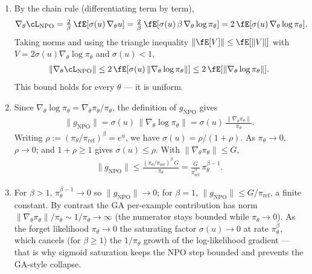\documentclass[12pt]{article}
\begin{document}
\begin{enumerate}
\begin{solution}
\begin{enumerate}
    \item By the chain rule (differentiating term by term),
    \begin{align*}
        \nabla_\theta\cL_{\mathrm{NPO}} = \tfrac{2}{\beta}\,\fE[\sigma(u)\,\nabla_\theta u] = \tfrac{2}{\beta}\,\fE[\sigma(u)\,\beta\,\nabla_\theta\log\pi_\theta] = 2\,\fE[\sigma(u)\,\nabla_\theta\log\pi_\theta].
    \end{align*}
    Taking norms and using the triangle inequality $\|\fE[V]\| \le \fE[\|V\|]$ with $V = 2\sigma(u)\nabla_\theta\log\pi_\theta$ and $\sigma(u) < 1$,
    \begin{align*}
        \|\nabla_\theta\cL_{\mathrm{NPO}}\| \le 2\,\fE[\sigma(u)\,\|\nabla_\theta\log\pi_\theta\|] \le 2\,\fE[\|\nabla_\theta\log\pi_\theta\|].
    \end{align*}
    This bound holds for every $\theta$ --- it is uniform.

    \item Since $\nabla_\theta\log\pi_\theta = \nabla_\theta\pi_\theta/\pi_\theta$, the definition of $g_{\mathrm{NPO}}$ gives
    \begin{align*}
        \|g_{\mathrm{NPO}}\| = \sigma(u)\,\|\nabla_\theta\log\pi_\theta\| = \sigma(u)\,\frac{\|\nabla_\theta\pi_\theta\|}{\pi_\theta}.
    \end{align*}
    Writing $\rho := (\pi_\theta/\pi_{\mathrm{ref}})^\beta = e^u$, we have $\sigma(u) = \rho/(1+\rho)$. As $\pi_\theta\to0$, $\rho\to0$; and $1+\rho\ge1$ gives $\sigma(u) \le \rho$. With $\|\nabla_\theta\pi_\theta\| \le G$,
    \begin{align*}
        \|g_{\mathrm{NPO}}\| \le \frac{(\pi_\theta/\pi_{\mathrm{ref}})^\beta\,G}{\pi_\theta} = \frac{G}{\pi_{\mathrm{ref}}^\beta}\,\pi_\theta^{\beta-1}.
    \end{align*}

    \item For $\beta > 1$, $\pi_\theta^{\beta-1}\to0$ so $\|g_{\mathrm{NPO}}\|\to0$; for $\beta = 1$, $\|g_{\mathrm{NPO}}\| \le G/\pi_{\mathrm{ref}}$, a finite constant. By contrast the GA per-example contribution has norm $\|\nabla_\theta\pi_\theta\|/\pi_\theta \sim 1/\pi_\theta \to \infty$ (the numerator stays bounded while $\pi_\theta\to0$). As the forget likelihood $\pi_\theta\to0$ the saturating factor $\sigma(u)\to0$ at rate $\pi_\theta^\beta$, which cancels (for $\beta\ge1$) the $1/\pi_\theta$ growth of the log-likelihood gradient --- that is why sigmoid saturation keeps the NPO step bounded and prevents the GA-style collapse.
\end{enumerate}
\end{solution}

\begin{problem}
    \newpage~\newpage~\newpage~\newpage
\end{problem}

\end{enumerate}
\end{document}
